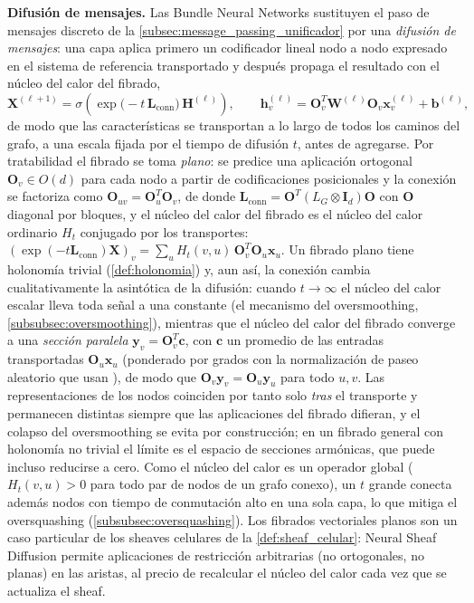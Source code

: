 \begin{example}
\textbf{Difusión de mensajes.} Las Bundle Neural Networks \citep{bamberger2024bundlenn} sustituyen el paso de mensajes discreto de la \autoref{subsec:message_passing_unificador} por una \textit{difusión de mensajes}: una capa aplica primero un codificador lineal nodo a nodo expresado en el sistema de referencia transportado y después propaga el resultado con el núcleo del calor del fibrado,
\begin{equation}
\mathbf{X}^{(\ell+1)} = \sigma\!\left(\exp\bigl(-t\,\mathbf{L}_{\mathrm{conn}}\bigr)\, \mathbf{H}^{(\ell)}\right), \qquad \mathbf{h}^{(\ell)}_v = \mathbf{O}_v^T \mathbf{W}^{(\ell)} \mathbf{O}_v \mathbf{x}^{(\ell)}_v + \mathbf{b}^{(\ell)},
\end{equation}
de modo que las características se transportan a lo largo de todos los caminos del grafo, a una escala fijada por el tiempo de difusión $t$, antes de agregarse. Por tratabilidad el fibrado se toma \textit{plano}: se predice una aplicación ortogonal $\mathbf{O}_v \in O(d)$ para cada nodo a partir de codificaciones posicionales y la conexión se factoriza como $\mathbf{O}_{uv} = \mathbf{O}_u^T \mathbf{O}_v$, de donde $\mathbf{L}_{\mathrm{conn}} = \mathbf{O}^T(L_G \otimes \mathbf{I}_d)\mathbf{O}$ con $\mathbf{O}$ diagonal por bloques, y el núcleo del calor del fibrado es el núcleo del calor ordinario $H_t$ conjugado por los transportes: $(\exp(-t\mathbf{L}_{\mathrm{conn}})\mathbf{X})_v = \sum_u H_t(v,u)\,\mathbf{O}_v^T\mathbf{O}_u\mathbf{x}_u$. Un fibrado plano tiene holonomía trivial (\autoref{def:holonomia}) y, aun así, la conexión cambia cualitativamente la asintótica de la difusión: cuando $t \to \infty$ el núcleo del calor escalar lleva toda señal a una constante (el mecanismo del \gls{oversmoothing}, \autoref{subsubsec:oversmoothing}), mientras que el núcleo del calor del fibrado converge a una \textit{sección paralela} $\mathbf{y}_v = \mathbf{O}_v^T \mathbf{c}$, con $\mathbf{c}$ un promedio de las entradas transportadas $\mathbf{O}_u \mathbf{x}_u$ (ponderado por grados con la normalización de paseo aleatorio que usan \citet{bamberger2024bundlenn}), de modo que $\mathbf{O}_v \mathbf{y}_v = \mathbf{O}_u \mathbf{y}_u$ para todo $u, v$. Las representaciones de los nodos coinciden por tanto solo \textit{tras} el transporte y permanecen distintas siempre que las aplicaciones del fibrado difieran, y el colapso del \gls{oversmoothing} se evita por construcción; en un fibrado general con holonomía no trivial el límite es el espacio de secciones armónicas, que puede incluso reducirse a cero. Como el núcleo del calor es un operador global ($H_t(v,u) > 0$ para todo par de nodos de un grafo conexo), un $t$ grande conecta además nodos con tiempo de conmutación alto en una sola capa, lo que mitiga el \gls{oversquashing} (\autoref{subsubsec:oversquashing}). Los fibrados vectoriales planos son un caso particular de los sheaves celulares de la \autoref{def:sheaf_celular}: Neural Sheaf Diffusion \citep{bodnar2022neural} permite aplicaciones de restricción arbitrarias (no ortogonales, no planas) en las aristas, al precio de recalcular el núcleo del calor cada vez que se actualiza el sheaf.
\end{example}


